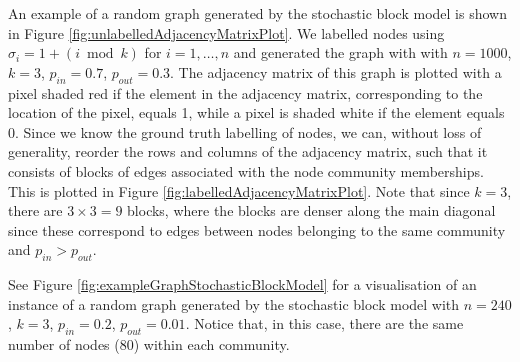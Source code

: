 \documentclass[12pt]{article}
\numberwithin{equation}{section}
\begin{document}
An example of a random graph generated by the stochastic block model is shown in Figure \ref{fig:unlabelledAdjacencyMatrixPlot}. We labelled nodes using $\sigma_{i} = 1 + (i \bmod{k})$ for $i = 1,\dots,n$ and generated the graph with with $n = 1000$, $k = 3$, $p_{in} = 0.7$, $p_{out} = 0.3$. The adjacency matrix of this graph is plotted with a pixel shaded red if the element in the adjacency matrix, corresponding to the location of the pixel, equals 1, while a pixel is shaded white if the element equals 0. Since we know the ground truth labelling of nodes, we can, without loss of generality, reorder the rows and columns of the adjacency matrix, such that it consists of blocks of edges associated with the node community memberships. This is plotted in Figure \ref{fig:labelledAdjacencyMatrixPlot}. Note that since $k = 3$, there are $3 \times 3 = 9$ blocks, where the blocks are denser along the main diagonal since these correspond to edges between nodes belonging to the same community and $p_{in} > p_{out}$.


See Figure \ref{fig:exampleGraphStochasticBlockModel} for a visualisation of an instance of a random graph generated by the stochastic block model with $n = 240$, $k = 3$, $p_{in} = 0.2$, $p_{out} = 0.01$. Notice that, in this case, there are the same number of nodes (80) within each community.

\end{document}
